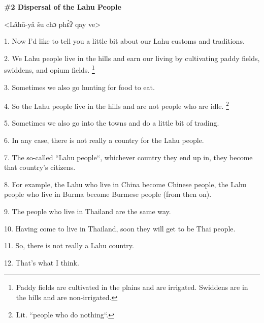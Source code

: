 
\textbf{\#2 Dispersal of the Lahu People}

<Lâhū-yâ šu chɔ phɛ̀ʔ qay ve>

1. Now I'd like to tell you a little bit about our Lahu customs and traditions.

2. We Lahu people live in the hills and earn our living by cultivating paddy fields,
swiddens, and opium fields. \footnote{Paddy fields are cultivated in the plains and are irrigated. Swiddens are in the hills and are non-irrigated.}

3. Sometimes we also go hunting for food to eat.

4. So the Lahu people live in the hills and are not people who are idle. \footnote{Lit. ``people who do nothing``.}

5. Sometimes we also go into the towns and do a little bit of trading.

6. In any case, there is not really a country for the Lahu people.

7. The so-called ``Lahu people``, whichever country they end up
in, they become that country's citizens.

8. For example, the Lahu who live in China become Chinese people, the Lahu people
who live in Burma become Burmese people (from then on).

9. The people who live in Thailand are the same way.

10. Having come to live in Thailand, soon they will get to be Thai people.

11. So, there is not really a Lahu country.

12. That's what I think.


